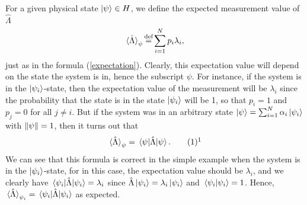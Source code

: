\documentclass[letter, 12pt]{turabian-thesis}
\theoremstyle{hypothesis}
\newcommand\myeq{\stackrel{\mathclap{\scriptsize\mbox{def}}}{=}}
\begin{document}
For a given physical state $\ket{\psi}\in H$, we define the expected measurement value of $\hat{\Lambda}$
\begin{equation}\label{expectation2}
\ev*{\hat{\Lambda}}_\psi\myeq\sum_{i=1}^N p_i\lambda_i,
\end{equation}
just as in the formula (\ref{expectation}). Clearly, this expectation value will depend on the state the system is in, hence the subscript $\psi$. For instance, if the system is in the $\ket{\psi_i}$-state, then the expectation value of the measurement will be $\lambda_i$ since the probability that the state is in the state $\ket{\psi_i}$ will be 1, so that $p_i=1$ and $p_j=0$ for all $j\neq i$. But if the system was in an arbitrary state $\ket{\psi}=\sum_{i=1}^N \alpha_i\ket{\psi_i}$ with $\norm{\psi}=1$, then it turns out that 
\begin{equation}\refstepcounter{equation}\label{evev}\ev*{\hat{\Lambda}}_\psi=\ev*{\hat{\Lambda}}{\psi}.\tag{\theequation}\protect\footnotemark
\end{equation}We can see that this formula is correct in the simple example when the system is in the $\ket{\psi_i}$-state, for in this case, the expectation value should be $\lambda_i$, and we clearly have $\ev*{\hat{\Lambda}}{\psi_i}=\lambda_i$ since $\hat{\Lambda}\ket{\psi_i}=\lambda_i\ket{\psi_i}$ and $\ip*{\psi_i}=1$. Hence, $\ev*{\hat{\Lambda}}_{\psi_i}=\ev*{\hat{\Lambda}}{\psi_i}$ as expected.
\end{document}
